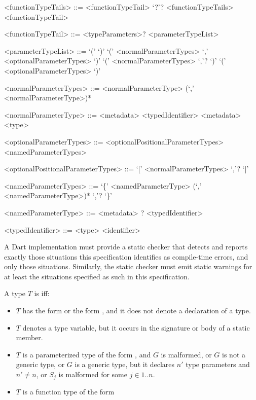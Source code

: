 \documentclass[makeidx]{article}
\begin{document}
{\begin{grammar}
<functionTypeTails> ::= <functionTypeTail> `?'? <functionTypeTails>
  \alt <functionTypeTail>

<functionTypeTail> ::= \FUNCTION{} <typeParameters>? <parameterTypeList>

<parameterTypeList> ::= `(' `)'
  \alt `(' <normalParameterTypes> `,' <optionalParameterTypes> `)'
  \alt `(' <normalParameterTypes> `,'? `)'
  \alt `(' <optionalParameterTypes> `)'

<normalParameterTypes> ::= \gnewline{}
  <normalParameterType> (`,' <normalParameterType>)*

<normalParameterType> ::= <metadata> <typedIdentifier>
  \alt <metadata> <type>

<optionalParameterTypes> ::= <optionalPositionalParameterTypes>
  \alt <namedParameterTypes>

<optionalPositionalParameterTypes> ::= `[' <normalParameterTypes> `,'? `]'

<namedParameterTypes> ::=
  `\{' <namedParameterType> (`,' <namedParameterType>)* `,'? `\}'

<namedParameterType> ::=
  <metadata> \REQUIRED? <typedIdentifier>

<typedIdentifier> ::= <type> <identifier>
\end{grammar}

\LMHash{}%
A Dart implementation must provide a static checker that detects and reports
exactly those situations this specification identifies as compile-time errors,
and only those situations.
Similarly, the static checker must emit static warnings
for at least the situations specified as such in this specification.


\LMHash{}%
A type $T$ is  if{}f:
\begin{itemize}
\item
  $T$ has the form \id{} or the form ,
  and it does not denote a declaration of a type.
\item
  $T$ denotes a type variable,
  but it occurs in the signature or body of a static member.
\item
  $T$ is a parameterized type of the form ,
  and $G$ is malformed,
  or $G$ is not a generic type,
  or $G$ is a generic type,
  but it declares $n'$ type parameters and $n' \not= n$,
  or $S_j$ is malformed for some $j \in 1 .. n$.
\item
  $T$ is a function type of the form


\end{itemize}}
\end{document}
